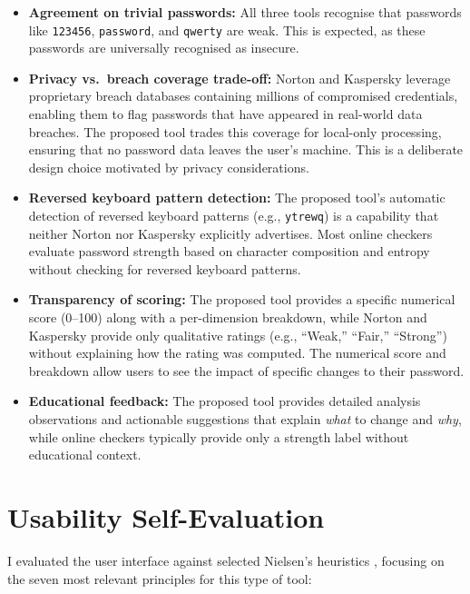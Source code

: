\begin{itemize}
    \item \textbf{Agreement on trivial passwords:} All three tools recognise that passwords like \texttt{123456}, \texttt{password}, and \texttt{qwerty} are weak. This is expected, as these passwords are universally recognised as insecure.

    \item \textbf{Privacy vs.\ breach coverage trade-off:} Norton and Kaspersky leverage proprietary breach databases containing millions of compromised credentials, enabling them to flag passwords that have appeared in real-world data breaches. The proposed tool trades this coverage for local-only processing, ensuring that no password data leaves the user's machine. This is a deliberate design choice motivated by privacy considerations.

    \item \textbf{Reversed keyboard pattern detection:} The proposed tool's automatic detection of reversed keyboard patterns (e.g., \texttt{ytrewq}) is a capability that neither Norton nor Kaspersky explicitly advertises. Most online checkers evaluate password strength based on character composition and entropy without checking for reversed keyboard patterns.

    \item \textbf{Transparency of scoring:} The proposed tool provides a specific numerical score (0--100) along with a per-dimension breakdown, while Norton and Kaspersky provide only qualitative ratings (e.g., ``Weak,'' ``Fair,'' ``Strong'') without explaining how the rating was computed. The numerical score and breakdown allow users to see the impact of specific changes to their password.

    \item \textbf{Educational feedback:} The proposed tool provides detailed analysis observations and actionable suggestions that explain \textit{what} to change and \textit{why}, while online checkers typically provide only a strength label without educational context.
\end{itemize}

\clearpage

\section{Usability Self-Evaluation}

I evaluated the user interface against selected Nielsen's heuristics \cite{nielsen1994}, focusing on the seven most relevant principles for this type of tool:


